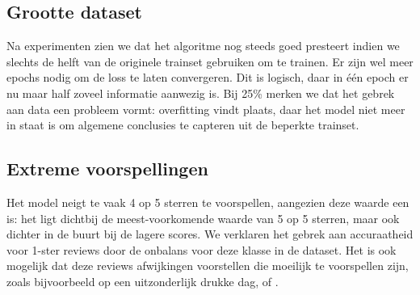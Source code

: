 \subsection{Grootte dataset}
Na experimenten zien we dat het algoritme nog steeds goed presteert indien we slechts de helft van de originele trainset gebruiken om te trainen. Er zijn wel meer epochs nodig om de loss te laten convergeren. Dit is logisch, daar in één epoch er nu maar half zoveel informatie aanwezig is. Bij 25\% merken we dat het gebrek aan data een probleem vormt: overfitting vindt plaats, daar het model niet meer in staat is om algemene conclusies te capteren uit de beperkte trainset.


\subsection{Extreme voorspellingen}
Het model neigt te vaak 4 op 5 sterren te voorspellen, aangezien deze waarde een  is: het ligt dichtbij de meest-voorkomende waarde van 5 op 5 sterren, maar ook dichter in de buurt bij de lagere scores. We verklaren het gebrek aan accuraatheid voor 1-ster reviews door de onbalans voor deze klasse in de dataset. Het is ook mogelijk dat deze reviews afwijkingen voorstellen die moeilijk te voorspellen zijn, zoals bijvoorbeeld  op een uitzonderlijk drukke dag, of .

